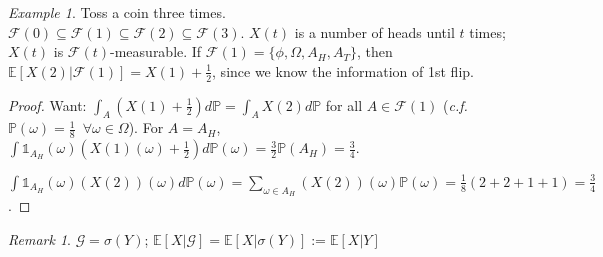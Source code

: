\documentclass[12pt]{report}
\renewcommand{\P}{\mathbb{P}}
\newcommand{\F}{\mathcal{F}}
\newcommand{\E}{\mathbb{E}}
\renewcommand{\1}{\mathbb{1}}
\renewcommand{\subset}{\subseteq}
\theoremstyle{break}
\theoremstyle{newdef}
\theoremstyle{remark}
\newtheorem*{exmp}{Example} %
\newtheorem*{rem}{Remark} %
\begin{document}
\begin{exmp}
Toss a coin three times.\\
$\F(0) \subset \F(1) \subset \F(2) \subset \F(3)$.
$X(t)$ is a number of heads until $t$ times; $X(t)$ is $\F(t)$-measurable.
If $\F(1) = \{ \phi, \Omega, A_H, A_T\}$, then
$\E[X(2) | \F(1)] = X(1) + \frac{1}{2}$, since we know the information of 1st flip.
\begin{proof}
Want: $\int_A (X(1) + \frac{1}{2})d\P = \int_A X(2) d\P$ for all $A \in \F(1)$
(\textit{c.f.} $\P(\omega) = \frac{1}{8} \enspace \forall \omega \in \Omega$).
For $A = A_H$, $\int \1_{A_H}(\omega) (X(1)(\omega) + \frac{1}{2})d\P(\omega) = \frac{3}{2}\P(A_H) = \frac{3}{4}$.

$\int \1_{A_H}(\omega)(X(2))(\omega) d\P(\omega)
= \sum_{\omega \in A_H} (X(2))(\omega)\P(\omega) = \frac{1}{8}(2+2+1+1) = \frac{3}{4}$.

\end{proof}
\end{exmp}

\begin{rem}
$\mathcal{G} = \sigma(Y)$;
$\E[X|\mathcal{G}] = \E[X | \sigma(Y)] := \E[X|Y]$
\end{rem}
\end{document}
